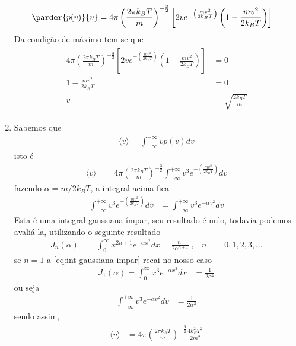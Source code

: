 \begin{prob}
\begin{sol}
\begin{enumerate}[label=\alph *)]
\begin{align}
\begin{split}
					\parder{p(v)}{v}&=4\pi\left(\frac{2\pi k_BT}{m}\right)^{-\frac{3}{2}}\left[2ve^{-\left(\frac{mv^2}{2k_BT}\right)}\left(1-\frac{mv^2}{2k_BT}\right)\right]
				\end{split}
			\end{align}
			Da condição de máximo tem se que
			\begin{align}
				\begin{split}
					4\pi\left(\frac{2\pi k_BT}{m}\right)^{-\frac{3}{2}}\left[2ve^{-\left(\frac{mv^2}{2k_BT}\right)}\left(1-\frac{mv^2}{2k_BT}\right)\right]&=0\\
					1-\frac{mv^2}{2k_BT}&=0\\
					v&=\sqrt{\frac{2k_BT}{m}}
				\end{split}
			\end{align}
			\item Sabemos que
			\begin{align}
				\langle v \rangle=\int_{-\infty}^{+\infty}vp(v)dv
			\end{align}
			isto é
			\begin{align}
				\langle v \rangle&=4\pi\left(\frac{2\pi k_BT}{m}\right)^{-\frac{3}{2}}\int_{-\infty}^{+\infty}v^3e^{-\left(\frac{mv^2}{2k_BT}\right)}dv
			\end{align}
			fazendo $\alpha=m/2k_BT$, a integral acima fica
			\begin{align}
				\int_{-\infty}^{+\infty}v^3e^{-\left(\frac{mv^2}{2k_BT}\right)}dv&=\int_{-\infty}^{+\infty}v^3e^{-\alpha v^2}dv
			\end{align}
			Esta é uma integral gaussiana ímpar, seu resultado é nulo, todavia podemos avaliá-la, utilizando o seguinte resultado
			\begin{align}
				\label{eq:int-gaussiana-impar}
				J_n(\alpha)&=\int_0^{\infty}x^{2n+1}e^{-\alpha x^2}dx=\frac{n!}{2\alpha^{n+1}}\;, & n&=0,1,2,3,\ldots
			\end{align}
			se $n=1$ a \eqref{eq:int-gaussiana-impar} recai no nosso caso
			\begin{align}
				J_1(\alpha)=\int_0^\infty x^3e^{-\alpha x^2}dx&=\frac{1}{2\alpha^2}
			\end{align}
			ou seja
			\begin{align}
				\int_{-\infty}^{+\infty}v^3e^{-\alpha v^2}dv&=\frac{1}{2\alpha^2}
			\end{align}
			sendo assim,
			\begin{align}
				\begin{split}
					\langle v \rangle&=4\pi\left(\frac{2\pi k_BT}{m}\right)^{-\frac{3}{2}}\frac{4k_B^2T^2}{2m^2}\\

\end{split}
\end{align}
\end{enumerate}
\end{sol}
\end{prob}

